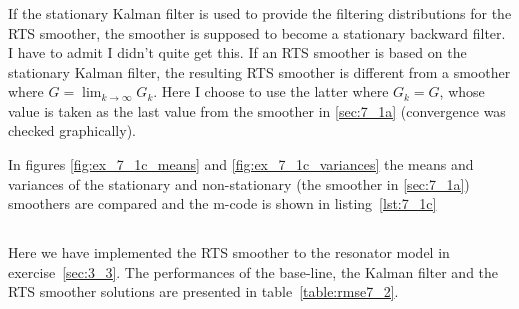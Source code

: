 \documentclass[a4paper,oneside,article]{memoir}
\begin{document}




\subsubsection{}\label{sec:7_1c}
If the stationary Kalman filter is used to provide the filtering distributions for the RTS smoother,
the smoother is supposed to become a stationary backward filter. I have to admit I didn't quite
get this. If an RTS smoother is based on the stationary Kalman filter, the resulting RTS smoother is different
from a smoother where $G=\lim_{k\to\infty}G_k$. Here I choose to use the latter where $G_k=G$, whose
value is taken as the last value from the smoother in \ref{sec:7_1a} (convergence was checked graphically).

In figures \ref{fig:ex_7_1c_means} and \ref{fig:ex_7_1c_variances} the means and variances of the
stationary and non-stationary (the smoother in \ref{sec:7_1a}) smoothers are compared and the m-code
is shown in listing~\ref{lst:7_1c}




\subsection{}\label{sec:7_2}

Here we have implemented the RTS smoother to the resonator model in exercise~\ref{sec:3_3}.
The performances of the base-line, the Kalman filter and the RTS smoother solutions
are presented in table~\ref{table:rmse7_2}.





\subsection{}\label{sec:7_3}
\end{document}
